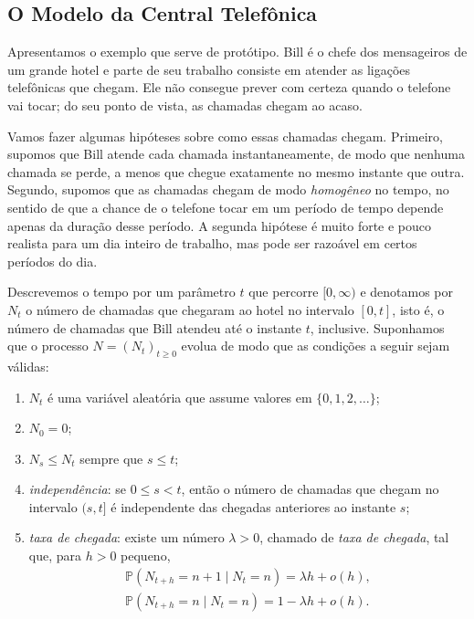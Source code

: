 \documentclass[12pt,portuguese]{article}
\theoremstyle{definition}
\theoremstyle{plainexercise}
\theoremstyle{starredexercise}
\theoremstyle{definition}
\begin{document}
\subsection{O Modelo da Central Telefônica}\label{subsec:modelo-central}

Apresentamos o exemplo que serve de protótipo. Bill é o chefe dos mensageiros
de um grande hotel e parte de seu trabalho consiste em atender as ligações
telefônicas que chegam. Ele não consegue prever com certeza quando o telefone
vai tocar; do seu ponto de vista, as chamadas chegam ao acaso. 

Vamos fazer algumas hipóteses sobre como essas chamadas chegam. Primeiro, supomos que Bill atende cada
chamada instantaneamente, de modo que nenhuma chamada se perde, a menos que
chegue exatamente no mesmo instante que outra. Segundo, supomos que as
chamadas chegam de modo \emph{homogêneo} no tempo, no sentido de que a chance
de o telefone tocar em um período de tempo depende apenas da duração desse período. A
segunda hipótese é muito forte e pouco realista para um dia inteiro de trabalho, mas pode ser
razoável em certos períodos do dia.

Descrevemos o tempo por um parâmetro $t$ que percorre $[0,\infty)$ e denotamos
por $N_t$ o número de chamadas que chegaram ao hotel no intervalo $[0,t]$, isto
é, o número de chamadas que Bill atendeu até o instante $t$, inclusive.
Suponhamos que o processo $N=(N_t)_{t\geqslant0}$ evolua de modo que as
condições a seguir sejam válidas:

\begin{enumerate}[label=\Alph*., itemsep=2pt]
  \item $N_t$ é uma variável aleatória que assume valores em
        $\{0,1,2,\ldots\}$;
  \item $N_0=0$;
  \item $N_s\leqslant N_t$ sempre que $s\leqslant t$;
  \item \emph{independência}: se $0\leqslant s<t$, então o número de chamadas
        que chegam no intervalo $(s,t]$ é independente das chegadas anteriores
        ao instante $s$;
  \item \emph{taxa de chegada}: existe um número $\lambda>0$, chamado de
        \emph{taxa de chegada}, tal que, para $h>0$ pequeno,
        \begin{gather*}
          \mathbb{P}(N_{t+h}=n+1\mid N_t=n)=\lambda h+o(h),
          \\[0.2cm]
          \mathbb{P}(N_{t+h}=n\mid N_t=n)=1-\lambda h+o(h).
        \end{gather*}
\end{enumerate}
\end{document}
